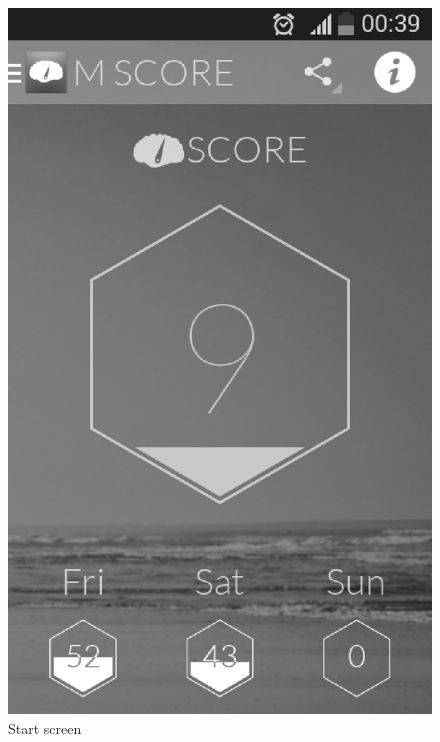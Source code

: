\begin{figure}[h]
\centering
\begin{minipage}{.5\textwidth}
  \centering
  \includegraphics [width=.8\textwidth]{images/Menthal_GUI_mainscreen}
  \caption{Start screen}
  \label{fig:menthal_gui_mainscreen}
\end{minipage}%
\begin{minipage}{.5\textwidth}
  \centering

\end{minipage}
\end{figure}
